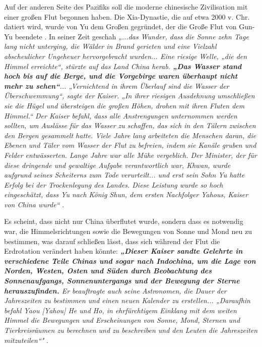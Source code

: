 \documentclass[10pt,twocolumn,letterpaper]{article}
\begin{document}
Auf der anderen Seite des Pazifiks soll die moderne chinesische Zivilisation mit einer großen Flut begonnen haben. Die Xia-Dynastie, die auf etwa 2000 v. Chr. datiert wird, wurde von Yu dem Großen gegründet, der die Große Flut von Gun-Yu beendete \cite{6}. In seiner Zeit geschah \textit{„...das Wunder, dass die Sonne zehn Tage lang nicht unterging, die Wälder in Brand gerieten und eine Vielzahl abscheulicher Ungeheuer hervorgebracht wurden... Eine riesige Welle, „die den Himmel erreichte“, stürzte auf das Land China herab. \textbf{„Das Wasser stand hoch bis auf die Berge, und die Vorgebirge waren überhaupt nicht mehr zu sehen“}... „Vernichtend in ihrem Überlauf sind die Wasser der Überschwemmung“, sagte der Kaiser. „In ihrer riesigen Ausdehnung umschließen sie die Hügel und übersteigen die großen Höhen, drohen mit ihren Fluten dem Himmel.“ Der Kaiser befahl, dass alle Anstrengungen unternommen werden sollten, um Auslässe für das Wasser zu schaffen, das sich in den Tälern zwischen den Bergen gesammelt hatte. Viele Jahre lang arbeiteten die Menschen daran, die Ebenen und Täler vom Wasser der Flut zu befreien, indem sie Kanäle gruben und Felder entwässerten. Lange Jahre war alle Mühe vergeblich. Der Minister, der für diese dringende und gewaltige Aufgabe verantwortlich war, Khwan, wurde aufgrund seines Scheiterns zum Tode verurteilt... und erst sein Sohn Yu hatte Erfolg bei der Trockenlegung des Landes. Diese Leistung wurde so hoch eingeschätzt, dass Yu nach König Shun, dem ersten Nachfolger Yahous, Kaiser von China wurde“} \cite{5}.

Es scheint, dass nicht nur China überflutet wurde, sondern dass es notwendig war, die Himmelsrichtungen sowie die Bewegungen von Sonne und Mond neu zu bestimmen, was darauf schließen lässt, dass sich während der Flut die Erdrotation verändert haben könnte: \textit{\textbf{„Dieser Kaiser sandte Gelehrte in verschiedene Teile Chinas und sogar nach Indochina, um die Lage von Norden, Westen, Osten und Süden durch Beobachtung des Sonnenaufgangs, Sonnenuntergangs und der Bewegung der Sterne herauszufinden.} Er beauftragte auch seine Astronomen, die Dauer der Jahreszeiten zu bestimmen und einen neuen Kalender zu erstellen... „Daraufhin befahl Yaou [Yahou] He und Ho, in ehrfürchtigem Einklang mit dem weiten Himmel die Bewegungen und Erscheinungen von Sonne, Mond, Sternen und Tierkreisräumen zu berechnen und zu beschreiben und den Leuten die Jahreszeiten mitzuteilen“"} \cite{5}.
\end{document}
